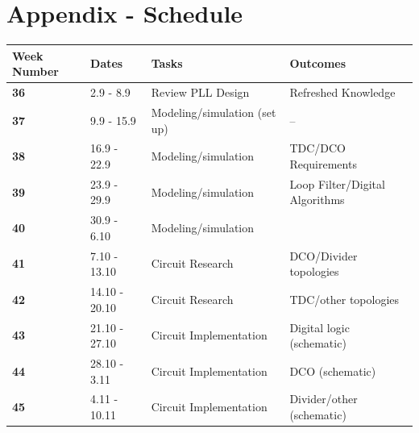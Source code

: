 \documentclass[10pt,a4paper]{article}
\begin{document}
	\section{Appendix - Schedule}
	\begin{table}
		\footnotesize
		\def\arraystretch{1.5}		
		\setlength\arrayrulewidth{0.75pt}
		\setlength{\tabcolsep}{1em} %
		\begin{tabular}{|l|l|l|l|}
			\hline 
			\rule[-1ex]{0pt}{2.5ex} \cellcolor{gray!40}\textbf{Week Number} & \cellcolor{gray!40}\textbf{Dates} &\cellcolor{gray!40}\textbf{Tasks} & \cellcolor{gray!40}\textbf{Outcomes}\\ 
			\hline 
			\rule[-1ex]{0pt}{2.5ex} \cellcolor{red!20}\textbf{36}& \cellcolor{red!20}2.9 - 8.9 & \cellcolor{red!20}Review PLL Design & \cellcolor{red!20}Refreshed Knowledge\\ 
			\hline 
			\rule[-1ex]{0pt}{2.5ex} \cellcolor{red!20}\textbf{37}& \cellcolor{red!20}9.9 - 15.9 & \cellcolor{red!20}Modeling/simulation (set up) & \cellcolor{red!20}--\\ 
			\hline 
			\rule[-1ex]{0pt}{2.5ex} \cellcolor{red!20}\textbf{38}& \cellcolor{red!20}16.9 - 22.9 & \cellcolor{red!20}Modeling/simulation &\cellcolor{red!20} TDC/DCO Requirements\\ 
			\hline 
			\rule[-1ex]{0pt}{2.5ex} \cellcolor{green!20}\textbf{39}& \cellcolor{green!20}23.9 - 29.9& \cellcolor{green!20}Modeling/simulation& \cellcolor{green!20}Loop Filter/Digital Algorithms\\ 
			\hline 
			\rule[-1ex]{0pt}{2.5ex} \cellcolor{blue!20}\textbf{40}& \cellcolor{blue!20}30.9 - 6.10& \cellcolor{blue!20}Modeling/simulation& \cellcolor{blue!20}\color{red}{\textbf{Loop filter,}} \color{black}{Ideal implementation in Cadence}\\ 
			\hline 
			\rule[-1ex]{0pt}{2.5ex} \textbf{41}& 7.10 - 13.10& Circuit Research & DCO/Divider topologies\\ 
			\hline 
			\rule[-1ex]{0pt}{2.5ex} \textbf{42}& 14.10 - 20.10& Circuit Research & TDC/other topologies\\ 
			\hline 
			\rule[-1ex]{0pt}{2.5ex} \textbf{43}& 21.10 - 27.10& Circuit Implementation& Digital logic (schematic)\\ 
			\hline 
			\rule[-1ex]{0pt}{2.5ex} \textbf{44}& 28.10 - 3.11& Circuit Implementation& DCO (schematic)\\ 
			\hline 
			\rule[-1ex]{0pt}{2.5ex} \textbf{45}& 4.11 - 10.11& Circuit Implementation& Divider/other (schematic)\\ 

\end{tabular}
\end{table}
\end{document}
